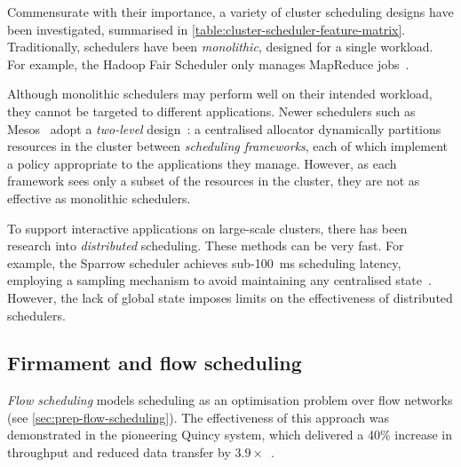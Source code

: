 
Commensurate with their importance, a variety of cluster scheduling designs have been investigated, summarised in \cref{table:cluster-scheduler-feature-matrix}. Traditionally, schedulers have been \emph{monolithic}, designed for a single workload. For example, the Hadoop Fair Scheduler only manages MapReduce jobs~\cite{HadoopFairSchedulerJIRA}.

Although monolithic schedulers may perform well on their intended workload, they cannot be targeted to different applications. Newer schedulers such as Mesos~\cite{Mesos} adopt a \emph{two-level} design~\cite[\S3.3]{Omega}: a centralised allocator dynamically partitions resources in the cluster between \emph{scheduling frameworks}, each of which implement a policy appropriate to the applications they manage. However, as each framework sees only a subset of the resources in the cluster, they are not as effective as monolithic schedulers.

To support interactive applications on large-scale clusters, there has been research into \emph{distributed} scheduling. These methods can be very fast. For example, the Sparrow scheduler achieves sub-\SI{100}{\milli\second} scheduling latency, employing a sampling mechanism to avoid maintaining any centralised state~\cite[fig.~10]{Ousterhout:2013}. However, the lack of global state imposes limits on the effectiveness of distributed schedulers.

\subsection{Firmament and flow scheduling}





\emph{Flow scheduling} models scheduling as an optimisation problem over flow networks (see \cref{sec:prep-flow-scheduling}). The effectiveness of this approach was demonstrated in the pioneering Quincy system, which delivered a 40\% increase in throughput and reduced data transfer by $3.9\times$~\cite{Isard:2009}. 

